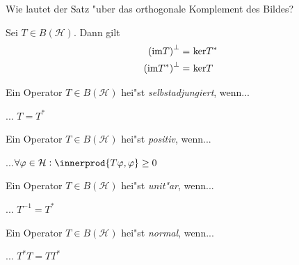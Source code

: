 \documentclass[9pt]{article}
\DeclarePairedDelimiter{\innerprod}\langle\rangle
\newcommand{\Hi}{\mathcal{H}}
\newenvironment{field}{}{\newpage}
\newif\ifnote
\newenvironment{note}{\notetrue}{\notefalse}
\newcommand{\localtag}{}
\newcommand{\globaltag}{}
\newcommand{\uuid}{}
\newcommand{\tags}[1]{
    \ifnote 
        \renewcommand{\localtag}{#1}
    \else
        \renewcommand{\globaltag}{#1}
    \fi 
    }
\newcommand{\xplain}[1]{\renewcommand{\uuid}{#1}}
\begin{document}
	\begin{note}
		\xplain{73250023-243d-431b-9f96-3cebc5b78556}
		\tags{6.2.5}
		
		\begin{field}  %
			Wie lautet der Satz "uber das orthogonale Komplement des Bildes?
		\end{field}
		
		\begin{field}  %
			Sei $T\in B(\Hi)$. Dann gilt
			\begin{align*}
				\qty(\text{im} T)^\perp =& \ \text{ker}T^*\\
				\qty(\text{im} T^*)^\perp =& \ \text{ker}T
			\end{align*}
		\end{field}
	\end{note}
	\begin{note}
		\xplain{f5c2e986-17a9-48b7-9d81-a42de0547888}
		\tags{}
		
		\begin{field}  %
			Ein Operator $T\in B(\Hi)$ hei"st \textit{selbstadjungiert}, wenn...
		\end{field}
		
		\begin{field}  %
		... $T=T^*$
		\end{field}
	
				\begin{field}  %
			Ein Operator $T\in B(\Hi)$ hei"st \textit{positiv}, wenn...
		\end{field}
		
		\begin{field}  %
			...$\forall \varphi \in \Hi: \innerprod{T\varphi, \varphi} \geq 0$
		\end{field}
	
				\begin{field}  %
			Ein Operator $T\in B(\Hi)$ hei"st \textit{unit"ar}, wenn...
		\end{field}
		
		\begin{field}  %
			... $T^{-1} = T^*$
		\end{field}
	
				\begin{field}  %
			Ein Operator $T\in B(\Hi)$ hei"st \textit{normal}, wenn...
		\end{field}
		
		\begin{field}  %
			... $T^*T=TT^*$
		\end{field}
	

\end{note}
\end{document}
